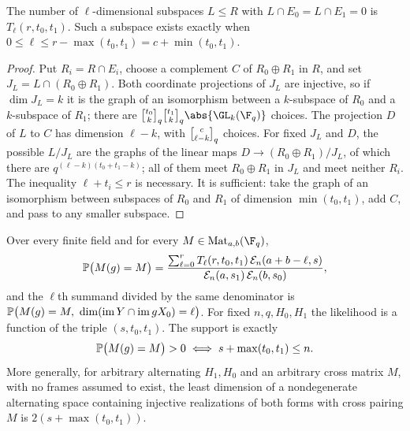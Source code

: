 \begin{lemma}\label{spn:lem:transverse}
The number of $\ell$-dimensional subspaces $L\le R$ with
$L\cap E_0=L\cap E_1=0$ is $T_\ell(r,t_0,t_1)$. Such a subspace exists exactly
when $0\le\ell\le r-\max(t_0,t_1)=c+\min(t_0,t_1)$.
\end{lemma}

\begin{proof}
Put $R_i=R\cap E_i$, choose a complement $C$ of $R_0\oplus R_1$ in $R$, and set
$J_L=L\cap(R_0\oplus R_1)$. Both coordinate projections of $J_L$ are
injective, so if $\dim J_L=k$ it is the graph of an isomorphism between a
$k$-subspace of $R_0$ and a $k$-subspace of $R_1$; there are
$\spnqbin{t_0}kq\spnqbin{t_1}kq\abs{\GL_k(\F_q)}$ choices. The projection $D$
of $L$ to $C$ has dimension $\ell-k$, with $\spnqbin c{\ell-k}q$ choices. For
fixed $J_L$ and $D$, the possible $L/J_L$ are the graphs of the linear maps
$D\to(R_0\oplus R_1)/J_L$, of which there are $q^{(\ell-k)(t_0+t_1-k)}$; all of
them meet $R_0\oplus R_1$ in $J_L$ and meet neither $R_i$. The inequality
$\ell+t_i\le r$ is necessary. It is sufficient: take the graph of an
isomorphism between subspaces of $R_0$ and $R_1$ of dimension
$\min(t_0,t_1)$, add $C$, and pass to any smaller subspace.
\end{proof}

\begin{theorem}\label{spn:thm:complete-law}
Over every finite field and for every $M\in\spnMat_{a,b}(\F_q)$,
\begin{equation}\label{spn:eq:complete-law}
 \mathbb{P}\bigl(M(g)=M\bigr)=
 \frac{\sum_{\ell=0}^{r}T_\ell(r,t_0,t_1)\,\mathcal{E}_n(a+b-\ell,s)}
 {\mathcal{E}_n(a,s_1)\,\mathcal{E}_n(b,s_0)} ,
\end{equation}
and the $\ell$th summand divided by the same denominator is
$\mathbb{P}\bigl(M(g)=M,\ \dim(\operatorname{im} Y\cap\operatorname{im} gX_0)=\ell\bigr)$. For fixed
$n,q,H_0,H_1$ the likelihood is a function of the triple $(s,t_0,t_1)$. The
support is exactly
\begin{equation}\label{spn:eq:complete-support}
 \mathbb{P}\bigl(M(g)=M\bigr)>0\iff s+\max(t_0,t_1)\le n .
\end{equation}
More generally, for arbitrary alternating $H_1,H_0$ and an arbitrary cross
matrix $M$, with no frames assumed to exist, the least dimension of a
nondegenerate alternating space containing injective realizations of both
forms with cross pairing $M$ is $2(s+\max(t_0,t_1))$.
\end{theorem}

